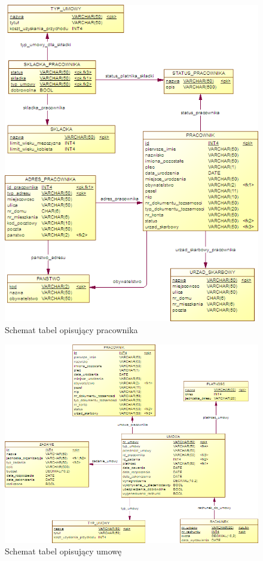 \begin{figure}[tdh]
    \begin{center}
	\includegraphics[scale=1]{img/fizyczny2.png}
	\caption{Schemat tabel opisujący pracownika}
	\label{fizyczny2}
    \end{center}
\end{figure}
\begin{figure}[tdh]
    \begin{center}
	\includegraphics[scale=1,angle=-90]{img/fizyczny3.png}
	\caption{Schemat tabel opisujący umowę}
	\label{fizyczny3}
    \end{center}
\end{figure}

